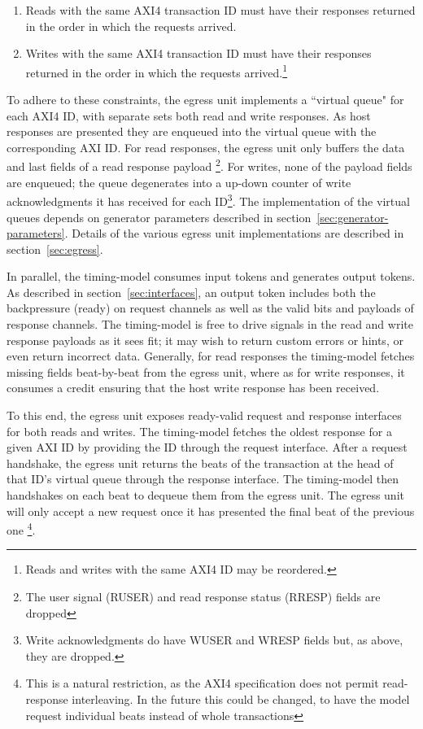 \begin{enumerate}

    \item Reads with the same AXI4 transaction ID must have their responses returned in the
        order in which the requests arrived.

    \item Writes with the same AXI4 transaction ID must have their responses returned in
        the order in which the requests arrived.\footnote{Reads and writes with
        the same AXI4 ID may be reordered.}

\end{enumerate}

To adhere to these constraints, the egress unit implements a ``virtual queue"
for each AXI4 ID, with separate sets both read and write responses. As host
responses are presented they are enqueued into the virtual queue with the
corresponding AXI ID. For read responses, the egress unit only buffers the data
and last fields of a read response payload \footnote{The user signal (RUSER)
and read response status (RRESP) fields are dropped}. For writes, none of the
payload fields are enqueued; the queue degenerates into a up-down counter of
write acknowledgments it has received for each ID\footnote{Write
acknowledgments do have WUSER and WRESP fields but, as above, they are
dropped.}. The implementation of the virtual queues depends on generator
parameters described in section~\ref{sec:generator-parameters}. Details of the
various egress unit implementations are described in section~\ref{sec:egress}.

In parallel, the timing-model consumes input tokens and generates output
tokens. As described in section~\ref{sec:interfaces}, an output token includes
both the backpressure (ready) on request channels as well as the valid bits and
payloads of response channels. The timing-model is free to drive signals in the
read and write response payloads as it sees fit; it may wish to return custom
errors or hints, or even return incorrect data. Generally, for read responses
the timing-model fetches missing fields beat-by-beat from the egress unit, where
as for write responses, it consumes a credit ensuring that the host write
response has been received.

To this end, the egress unit exposes ready-valid request and response
interfaces for both reads and writes. The timing-model fetches the oldest
response for a given AXI ID by providing the ID through the request interface.
After a request handshake, the egress unit returns the beats of the transaction
at the head of that ID's virtual queue through the response interface. The
timing-model then handshakes on each beat to dequeue them from the egress unit.
The egress unit will only accept a new request once it has presented the final
beat of the previous one \footnote{This is a natural restriction, as the AXI4
specification does not permit read-response interleaving. In the future this
could be changed, to have the model request individual beats instead of whole
transactions}.


